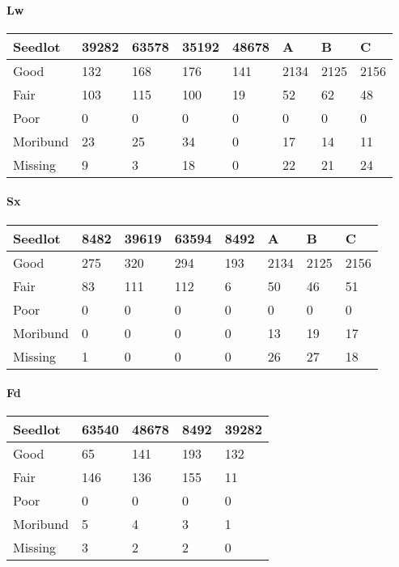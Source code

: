 \documentclass[
]{article}
\begin{document}
\hypertarget{lw}{%
\paragraph{Lw}\label{lw}}

\begin{tabular}{l|l|l|l|l|l|l|l}
\hline
Seedlot & 39282 & 63578 & 35192 & 48678 & A & B & C\\
\hline
Good & 132 & 168 & 176 & 141 & 2134 & 2125 & 2156\\
\hline
Fair & 103 & 115 & 100 & 19 & 52 & 62 & 48\\
\hline
Poor & 0 & 0 & 0 & 0 & 0 & 0 & 0\\
\hline
Moribund & 23 & 25 & 34 & 0 & 17 & 14 & 11\\
\hline
Missing & 9 & 3 & 18 & 0 & 22 & 21 & 24\\
\hline
\end{tabular}

\hypertarget{sx}{%
\paragraph{Sx}\label{sx}}

\begin{tabular}{l|l|l|l|l|l|l|l}
\hline
Seedlot & 8482 & 39619 & 63594 & 8492 & A & B & C\\
\hline
Good & 275 & 320 & 294 & 193 & 2134 & 2125 & 2156\\
\hline
Fair & 83 & 111 & 112 & 6 & 50 & 46 & 51\\
\hline
Poor & 0 & 0 & 0 & 0 & 0 & 0 & 0\\
\hline
Moribund & 0 & 0 & 0 & 0 & 13 & 19 & 17\\
\hline
Missing & 1 & 0 & 0 & 0 & 26 & 27 & 18\\
\hline
\end{tabular}

\hypertarget{fd}{%
\paragraph{Fd}\label{fd}}

\begin{tabular}{l|l|l|l|l}
\hline
Seedlot & 63540 & 48678 & 8492 & 39282\\
\hline
Good & 65 & 141 & 193 & 132\\
\hline
Fair & 146 & 136 & 155 & 11\\
\hline
Poor & 0 & 0 & 0 & 0\\
\hline
Moribund & 5 & 4 & 3 & 1\\
\hline
Missing & 3 & 2 & 2 & 0\\
\hline
\end{tabular}
\end{document}
